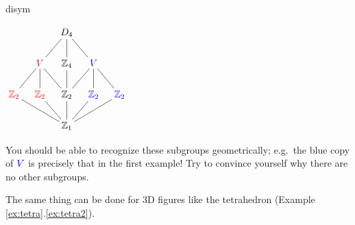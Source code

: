 \begin{examples}{}{disym}
\begin{enumerate}
\begin{minipage}[t]{\linewidth}
\begin{minipage}[t]{.31\linewidth}
			$\xymatrix @R18pt @C10pt{%
				&& D_4 \ar@{-}[dl] \ar@{-}[d] \ar@{-}[dr] &&\\
				& \textcolor{red}{V} \ar@{-}[dr] \ar@{-}[d] \ar@{-}[dl] & \Z_4 \ar@{-}[d] & \textcolor{blue}{V} \ar@{-}[dr] \ar@{-}[d] \ar@{-}[dl] & \\
				\textcolor{red}{\Z_2} \ar@{-}[drr] & \textcolor{red}{\Z_2} \ar@{-}[dr] & \Z_2 \ar@{-}[d] & \textcolor{blue}{\Z_2} \ar@{-}[dl] & \textcolor{blue}{\Z_2} \ar@{-}[dll] \\
				&& \Z_1 &&
			}$
		\end{minipage}
	\end{minipage}\par
	
	You should be able to recognize these subgroups geometrically; e.g.\ the blue copy of $\textcolor{blue}{V}$ is precisely that in the first example! Try to convince yourself why there are no other subgroups.
	\end{enumerate}
\end{examples}
The same thing can be done for 3D figures like the tetrahedron (Example \ref*{ex:tetra}.\ref{ex:tetra2}).

\goodbreak

